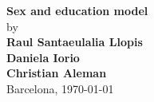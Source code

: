 \begin{center} 


\Large{
\textbf{Sex and education model}\\
\vspace{0.5cm}
\Large {by}\\  
\vspace{0.25cm}
\textbf{Raul Santaeulalia Llopis}\\
\vspace{0.25cm}
\textbf{Daniela Iorio}\\
\vspace{0.25cm}
\textbf{Christian Aleman}\\
}
\vspace{0.7cm}
\vspace{0.7cm}
Barcelona,\,\,\today \\
\vspace{0.3cm}
    

  
\end{center}




  
